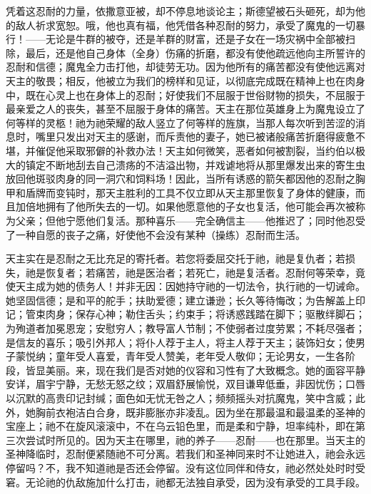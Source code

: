 凭着这忍耐的力量，依撒意亚被，却不停息地谈论主；斯德望被石头砸死，却为他的敌人祈求宽恕。哦，他也真有福，他凭借各种忍耐的努力，承受了魔鬼的一切暴行！——无论是牛群的被夺，还是羊群的财富，还是子女在一场灾祸中全部被扫除，最后，还是他自己身体（全身）伤痛的折磨，都没有使他疏远他向主所誓许的忍耐和信德；魔鬼全力击打他，却徒劳无功。因为他所有的痛苦都没有使他远离对天主的敬畏；相反，他被立为我们的榜样和见证，以彻底完成既在精神上也在肉身中，既在心灵上也在身体上的忍耐；好使我们不屈服于世俗财物的损失，不屈服于最亲爱之人的丧失，甚至不屈服于身体的痛苦。天主在那位英雄身上为魔鬼设立了何等样的灵柩！祂为祂荣耀的敌人竖立了何等样的旌旗，当那人每次听到苦涩的消息时，嘴里只发出对天主的感谢，而斥责他的妻子，她已被诸般痛苦折磨得疲惫不堪，并催促他采取邪僻的补救办法！天主如何微笑，恶者如何被割裂，当约伯以极大的镇定不断地刮去自己溃疡的不洁溢出物，并戏谑地将从那里爆发出来的寄生虫放回他斑驳肉身的同一洞穴和饲料场！因此，当所有诱惑的箭矢都因他的忍耐之胸甲和盾牌而变钝时，那天主胜利的工具不仅立即从天主那里恢复了身体的健康，而且加倍地拥有了他所失去的一切。如果他愿意他的子女也复活，他可能会再次被称为父亲；但他宁愿他们复活。那种喜乐——完全确信主——他推迟了；同时他忍受了一种自愿的丧子之痛，好使他不会没有某种（操练）忍耐而生活。\par


天主实在是忍耐之无比充足的寄托者。若您将委屈交托于祂，祂是复仇者；若损失，祂是恢复者；若痛苦，祂是医治者；若死亡，祂是复活者。忍耐何等荣幸，竟使天主成为她的债务人！并非无因：因她持守祂的一切法令，执行祂的一切诫命。她坚固信德；是和平的舵手；扶助爱德；建立谦逊；长久等待悔改；为告解盖上印记；管束肉身；保存心神；勒住舌头；约束手；将诱惑践踏在脚下；驱散绊脚石；为殉道者加冕恩宠；安慰穷人；教导富人节制；不使弱者过度劳累；不耗尽强者；是信友的喜乐；吸引外邦人；将仆人荐于主人，将主人荐于天主；装饰妇女；使男子蒙悦纳；童年受人喜爱，青年受人赞美，老年受人敬仰；无论男女，一生各阶段，皆显美丽。来，现在我们是否对她的仪容和习性有了大致概念。她的面容平静安详，眉宇宁静，无愁无怒之纹；双眉舒展愉悦，双目谦卑低垂，非因忧伤；口唇以沉默的高贵印记封缄；面色如无忧无咎之人；频频摇头对抗魔鬼，笑中含威；此外，她胸前衣袍洁白合身，既非膨胀亦非凌乱。因为坐在那最温和最温柔的圣神的宝座上；祂不在旋风滚滚中，不在乌云铅色里，而是柔和宁静，坦率纯朴，即在第三次尝试时所见的。因为天主在哪里，祂的养子——忍耐——也在那里。当天主的圣神降临时，忍耐便紧随祂不可分离。若我们和圣神同来时不让她进入，祂会永远停留吗？不，我不知道祂是否还会停留。没有这位同伴和侍女，祂必然处处时时受窘。无论祂的仇敌施加什么打击，祂都无法独自承受，因为没有承受的工具手段。\par

